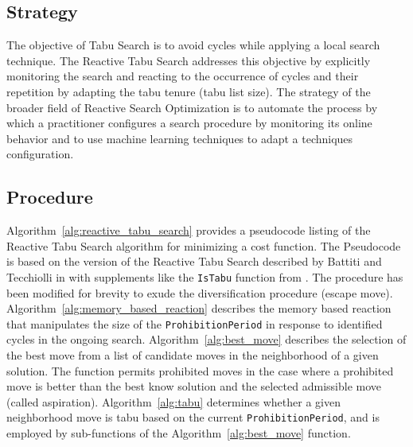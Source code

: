 \subsection{Strategy}
The objective of Tabu Search is to avoid cycles while applying a local search technique. The Reactive Tabu Search addresses this objective by explicitly monitoring the search and reacting to the occurrence of cycles and their repetition by adapting the tabu tenure (tabu list size).
The strategy of the broader field of Reactive Search Optimization is to automate the process by which a practitioner configures a search procedure by monitoring its online behavior and to use machine learning techniques to adapt a techniques configuration.

\subsection{Procedure}
Algorithm~\ref{alg:reactive_tabu_search} provides a pseudocode listing of the Reactive Tabu Search algorithm for minimizing a cost function. 
The Pseudocode is based on the version of the Reactive Tabu Search described by Battiti and Tecchiolli in \cite{Battiti1995a} with supplements like the \texttt{Is\-Tabu} function from \cite{Battiti1994}. The procedure has been modified for brevity to exude the diversification procedure (escape move). Algorithm~\ref{alg:memory_based_reaction} describes the memory based reaction that manipulates the size of the \texttt{Prohibition\-Period} in response to identified cycles in the ongoing search. Algorithm~\ref{alg:best_move} describes the selection of the best move from a list of candidate moves in the neighborhood of a given solution. The function permits prohibited moves in the case where a prohibited move is better than the best know solution and the selected admissible move (called aspiration). Algorithm~\ref{alg:tabu} determines whether a given neighborhood move is tabu based on the current \texttt{Prohibition\-Period}, and is employed by sub-functions of the Algorithm~\ref{alg:best_move} function.

